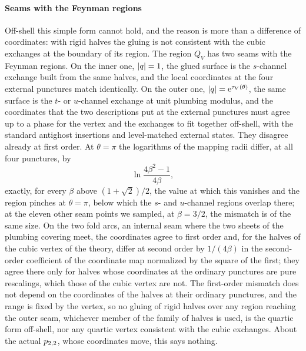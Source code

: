 \paragraph{Seams with the Feynman regions}
\label{p:sec:ws:seams}

Off-shell this simple form cannot hold, and the reason is more than a difference of coordinates: with rigid halves the gluing is not consistent with the cubic exchanges at the boundary of its region.
The region $Q_V$ has two seams with the Feynman regions.
On the inner one, ${|q|} = 1$, the glued surface is the $s$-channel exchange built from the same halves, and the local coordinates at the four external punctures match identically.
On the outer one, ${|q|} = \mathrm{e}^{\tau_V(\theta)}$, the same surface is the $t$- or $u$-channel exchange at unit plumbing modulus, and the coordinates that the two descriptions put at the external punctures must agree up to a phase for the vertex and the exchanges to fit together off-shell, with the standard antighost insertions and level-matched external states.
They disagree already at first order.
At $\theta = \pi$ the logarithms of the mapping radii differ, at all four punctures, by
\begin{equation}
  \label{p:eq:ws:seam-mismatch}
  \ln \frac{4 \beta^2 - 1}{4 \beta},
\end{equation}
exactly, for every $\beta$ above $(1 + \sqrt 2) / 2$, the value at which this vanishes and the region pinches at $\theta = \pi$, below which the $s$- and $u$-channel regions overlap there; at the eleven other seam points we sampled, at $\beta = 3 / 2$, the mismatch is of the same size.
On the two fold arcs, an internal seam where the two sheets of the plumbing covering meet, the coordinates agree to first order and, for the halves of the cubic vertex of the theory, differ at second order by $1 / (4 \beta)$ in the second-order coefficient of the coordinate map normalized by the square of the first; they agree there only for halves whose coordinates at the ordinary punctures are pure rescalings, which those of the cubic vertex are not.
The first-order mismatch does not depend on the coordinates of the halves at their ordinary punctures, and the range is fixed by the vertex, so no gluing of rigid halves over any region reaching the outer seam, whichever member of the family of halves is used, is the quartic form off-shell, nor any quartic vertex consistent with the cubic exchanges.
About the actual $p_{2,2}$, whose coordinates move, this says nothing.


